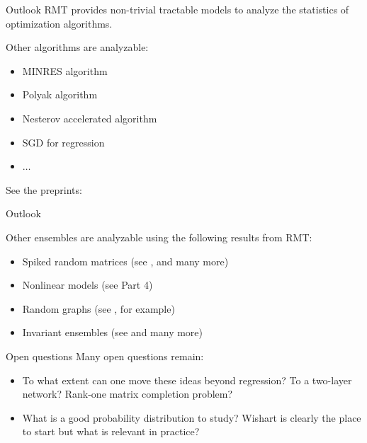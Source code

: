 \documentclass[9pt,aspectratio=169]{beamer}
\begin{document}
\begin{frame}{Outlook}
    RMT provides non-trivial tractable models to analyze the statistics of optimization algorithms.\\
    
    \vspace{.05in}
    
    Other algorithms are analyzable:
    \begin{itemize}
        \item MINRES algorithm
        \item Polyak algorithm
        \item Nesterov accelerated algorithm
        \item SGD for regression
        \item $\ldots$
    \end{itemize}
    See the preprints: \cite{paquette2020universality,Paquette2021,Ding2021,Paquette2020a}

    \end{frame}
    
    \begin{frame}{Outlook}

    Other ensembles are analyzable using the following results from RMT:
    \begin{itemize}
        \item Spiked random matrices (see \cite{Baik2005,Bloemendal2013,Ding2019}, and many more)
        \item Nonlinear models (see Part 4)
        \item Random graphs (see \cite{Erdos2013a}, for example)
        \item Invariant ensembles (see \cite{Bourgade2014,DeiftOrthogonalPolynomials} and many more)
    \end{itemize}

    \end{frame}
    
    \begin{frame}{Open questions}
    Many open questions remain:
    \begin{itemize}
        \item \pause To what extent can one move these ideas beyond regression?  To a two-layer network?  Rank-one matrix completion problem?
        \item \pause What is a good probability distribution to study? Wishart is clearly the place to start but what is relevant in practice?
    \end{itemize}
\end{frame}
\end{document}
